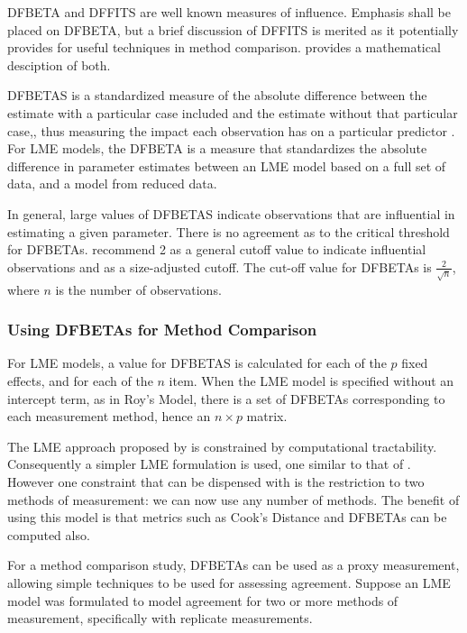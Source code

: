 \documentclass[12pt, a4paper]{report}
\theoremstyle{plain}
\theoremstyle{definition}
\theoremstyle{remark}
\begin{document}
DFBETA and DFFITS are well known measures of influence. Emphasis shall be placed on DFBETA, but a brief discussion of DFFITS is merited as it potentially provides for useful techniques in method comparison. \citet{schabenberger} provides a mathematical desciption of both.


DFBETAS is a standardized measure of the absolute difference between the estimate with a particular
case included and the estimate without that particular case,, thus measuring the impact each observation has on a particular predictor \citep{belsley2005}. For LME models, the DFBETA is a measure that standardizes the absolute difference in parameter estimates between an LME model based on a full set of data, and a model from reduced data.

In general, large values of DFBETAS indicate observations that are influential in estimating a given parameter. There is no agreement as to the critical threshold for DFBETAs. \citet{belsley2005} recommend 2 as a general cutoff value to indicate influential observations and as a size-adjusted cutoff.  The cut-off value for DFBETAs is $\frac{2}{\sqrt{n}}$, where $n$ is the number of observations. 



\subsubsection{Using DFBETAs for Method Comparison}
For LME models, a value for DFBETAS is calculated for each of the $p$ fixed effects, and for each of the $n$ item. When the LME model is specified without an intercept term, as in Roy's Model, there is a set of DFBETAs corresponding to each measurement method, hence an $n \times p$ matrix.

The LME approach proposed by \citet{ARoy2009} is constrained by computational tractability. Consequently a simpler LME formulation is used, one similar to that of \citet{BXC2008}. However one constraint that can be dispensed with is the restriction to two methods of measurement: we can now use any number of methods. The benefit of using this model is that metrics such as Cook's Distance and DFBETAs can be computed also.

For a method comparison study, DFBETAs can be used as a proxy measurement, allowing simple techniques to be used for assessing agreement. Suppose an LME model was formulated to model agreement for two or more methods of measurement, specifically with replicate measurements.
\end{document}
